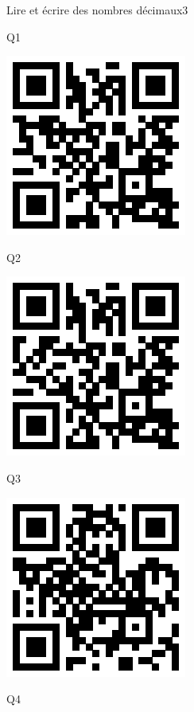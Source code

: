 \documentclass[a4paper,11pt]{report}
\begin{document}
\begin{qmoodle}{Lire et écrire des nombres décimaux}{3}{
	\begin{center}
		Q1

		\includegraphics[scale=1]{img/no2nd/ndlend/ndlend_1}
	\end{center}
	\begin{center}
		Q2

		\includegraphics[scale=1]{img/no2nd/ndlend/ndlend_2}
	\end{center}
	\begin{center}
		Q3

		\includegraphics[scale=1]{img/no2nd/ndlend/ndlend_3}
	\end{center}
	\begin{center}
		Q4


\end{center}}
\end{qmoodle}
\end{document}
